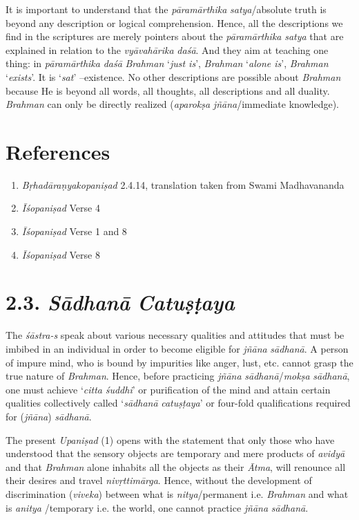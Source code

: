 It is important to understand that the \emph{pāramārthika} \emph{satya}/absolute truth is beyond any description or logical comprehension. Hence, all the descriptions we find in the scriptures are merely pointers about the \emph{pāramārthika} \emph{satya} that are explained in relation to the \emph{vyāvahārika} \emph{daśā}. And they aim at teaching one thing: in \emph{pāramārthika} \emph{daśā} \emph{Brahman} `\emph{just is}', \emph{Brahman} `\emph{alone is}', \emph{Brahman} `\emph{exists}'. It is `\emph{sat}' --existence. No other descriptions are possible about \emph{Brahman} because He is beyond all words, all thoughts, all descriptions and all duality. \emph{Brahman} can only be directly realized (\emph{aparokṣa} \emph{jñāna}/immediate knowledge).

\section*{References}

\begin{enumerate}
\itemsep=0pt
\item
  \emph{Bṛhadāraṇyakopaniṣad} 2.4.14, translation taken from Swami Madhavananda
\item
  \emph{Īśopaniṣad} Verse 4
\item
  \emph{Īśopaniṣad} Verse 1 and 8
\item
  \emph{Īśopaniṣad} Verse 8
\end{enumerate}
\newpage

\section*{2.3. \emph{Sādhanā} \emph{Catuṣṭaya}}

The \emph{śāstra-s} speak about various necessary qualities and attitudes that must be imbibed in an individual in order to become eligible for \emph{jñāna} \emph{sādhanā}. A person of impure mind, who is bound by impurities like anger, lust, etc. cannot grasp the true nature of \emph{Brahman}. Hence, before practicing \emph{jñāna} \emph{sādhanā}/\emph{mokṣa} \emph{sādhanā}, one must achieve `\emph{citta} \emph{śuddhi}' or purification of the mind and attain certain qualities collectively called `\emph{sādhanā} \emph{catuṣṭaya}' or four-fold qualifications required for (\emph{jñāna}) \emph{sādhanā}.

The present \emph{Upaniṣad} (1) opens with the statement that only those who have understood that the sensory objects are temporary and mere products of \emph{avidyā} and that \emph{Brahman} alone inhabits all the objects as their \emph{Ātma}, will renounce all their desires and travel \emph{nivṛttimārga}. Hence, without the development of discrimination (\emph{viveka}) between what is \emph{nitya}/permanent i.e. \emph{Brahman} and what is \emph{anitya} /temporary i.e. the world, one cannot practice \emph{jñāna} \emph{sādhanā}.

